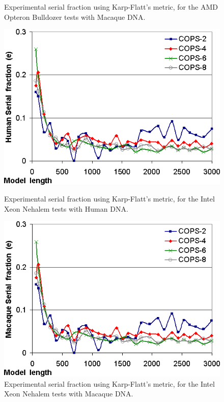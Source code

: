 \begin{figure}[h!]
\begin{minipage}{0.48\linewidth}
		\caption[Serial fraction on AMD Opteron Bulldozer, Macaque] {Experimental serial fraction using Karp-Flatt's metric, for the AMD Opteron Bulldozer tests with Macaque DNA.}
	\label{karp-flatt-aleph-macaque}
    \end{minipage}
\end{figure} 

\begin{figure}[h!]
    \begin{minipage}{0.48\linewidth}
		\centering
		\includegraphics[scale=0.46]{graphics/karp-flatt-tags-human.png}
		\caption[Serial fraction on Intel Xeon Nehalem, Human] {Experimental serial fraction using Karp-Flatt's metric, for the Intel Xeon Nehalem tests with Human DNA.}
		\label{karp-flatt-tags-human}
    \end{minipage}
    \hspace{0.04\linewidth}
    \begin{minipage}{0.48\linewidth}
		\centering
		\includegraphics[scale=0.46]{graphics/karp-flatt-tags-macaque.png}
		\caption[Serial fraction on Intel Xeon Nehalem, Macaque] {Experimental serial fraction using Karp-Flatt's metric, for the Intel Xeon Nehalem tests with Macaque DNA.}
		\label{karp-flatt-tags-macaque}
	\end{minipage}
\end{figure} 

